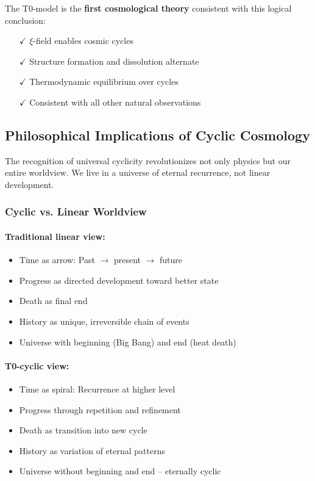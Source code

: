\documentclass[12pt,a4paper]{article}
\theoremstyle{definition}
\begin{document}
	The T0-model is the \textbf{first cosmological theory} consistent with this logical conclusion:
	\begin{itemize}
		\item[$\checkmark$] $\xi$-field enables cosmic cycles
		\item[$\checkmark$] Structure formation and dissolution alternate
		\item[$\checkmark$] Thermodynamic equilibrium over cycles
		\item[$\checkmark$] Consistent with all other natural observations
	\end{itemize}
	
	\subsection{Philosophical Implications of Cyclic Cosmology}
	
	\begin{revolutionary}
		The recognition of universal cyclicity revolutionizes not only physics but our entire worldview. We live in a universe of eternal recurrence, not linear development.
	\end{revolutionary}
	
	\subsubsection{Cyclic vs. Linear Worldview}
	
	\paragraph{Traditional linear view:}
	\begin{itemize}
		\item Time as arrow: Past $\to$ present $\to$ future
		\item Progress as directed development toward better state
		\item Death as final end
		\item History as unique, irreversible chain of events
		\item Universe with beginning (Big Bang) and end (heat death)
	\end{itemize}
	
	\paragraph{T0-cyclic view:}
	\begin{itemize}
		\item Time as spiral: Recurrence at higher level
		\item Progress through repetition and refinement
		\item Death as transition into new cycle
		\item History as variation of eternal patterns
		\item Universe without beginning and end -- eternally cyclic
	\end{itemize}
	
\end{document}
